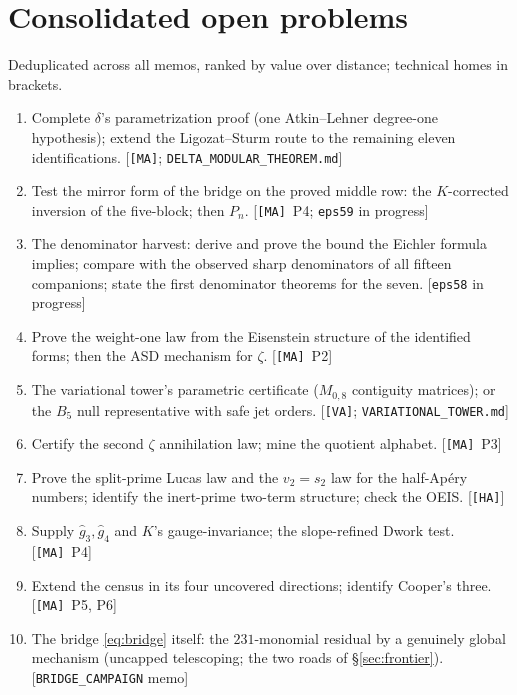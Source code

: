 \documentclass[11pt,reqno]{amsart}
\theoremstyle{plain}
\theoremstyle{definition}
\theoremstyle{remark}
\newcommand{\MA}{\texttt{[MA]}}
\newcommand{\VA}{\texttt{[VA]}}
\newcommand{\HA}{\texttt{[HA]}}
\begin{document}
\section{Consolidated open problems}\label{sec:open}

Deduplicated across all memos, ranked by value over distance; technical
homes in brackets.
\begin{enumerate}[leftmargin=2em,label=\textbf{P\arabic*.}]
\item Complete $\delta$'s parametrization proof (one Atkin--Lehner
degree-one hypothesis); extend the Ligozat--Sturm route to the remaining
eleven identifications. [\MA; \texttt{DELTA\_MODULAR\_THEOREM.md}]
\item Test the mirror form of the bridge on the proved middle row: the
$K$-corrected inversion of the five-block; then $P_n$. [\MA\ P4;
\texttt{eps59} in progress]
\item The denominator harvest: derive and prove the bound the Eichler
formula implies; compare with the observed sharp denominators of all
fifteen companions; state the first denominator theorems for the seven.
[\texttt{eps58} in progress]
\item Prove the weight-one law from the Eisenstein structure of the
identified forms; then the ASD mechanism for $\zeta$. [\MA\ P2]
\item The variational tower's parametric certificate ($M_{0,8}$
contiguity matrices); or the $B_5$ null representative with safe jet
orders. [\VA; \texttt{VARIATIONAL\_TOWER.md}]
\item Certify the second $\zeta$ annihilation law; mine the quotient
alphabet. [\MA\ P3]
\item Prove the split-prime Lucas law and the $v_2=s_2$ law for the
half-Ap\'ery numbers; identify the inert-prime two-term structure; check
the OEIS. [\HA]
\item Supply $\hat g_3,\hat g_4$ and $K$'s gauge-invariance; the
slope-refined Dwork test. [\MA\ P4]
\item Extend the census in its four uncovered directions; identify
Cooper's three. [\MA\ P5, P6]
\item The bridge \eqref{eq:bridge} itself: the $231$-monomial residual by
a genuinely global mechanism (uncapped telescoping; the two roads of
\S\ref{sec:frontier}). [\texttt{BRIDGE\_CAMPAIGN} memo]
\end{enumerate}

\appendix
\end{document}
